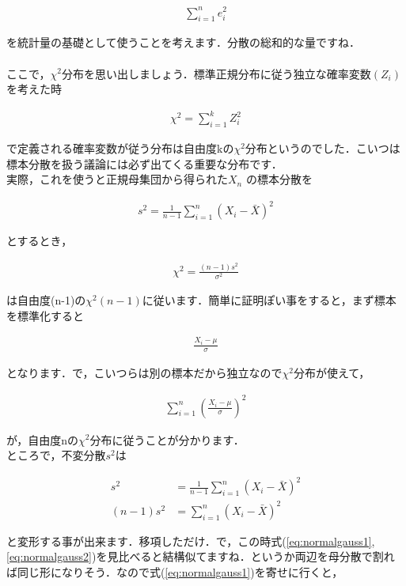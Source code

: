 \documentclass[11pt,a4paper,uplatex]{ujreport} 	%
\begin{document}
\begin{align}
  \sum_{i=1}^n e_i^2
\end{align}

を統計量の基礎として使うことを考えます．分散の総和的な量ですね．\\
\\


ここで，$\chi^2$分布を思い出しましょう．標準正規分布に従う独立な確率変数$(Z_i)$を考えた時

\begin{align}
  \chi^2 = \sum_{i=1}^k Z_i^2
\end{align}

で定義される確率変数が従う分布は自由度kの$\chi^2$分布というのでした．こいつは標本分散を扱う議論には必ず出てくる重要な分布です．\\

実際，これを使うと正規母集団から得られた$X_n$
の標本分散を

\begin{align}
  s^2 = \frac{1}{n-1}\sum_{i=1}^n (X_i - \bar{X})^2
\end{align}

とするとき，

\begin{align}
  \chi^2 = \frac{(n-1)s^2}{\sigma^2}
  \label{eq:chi}
\end{align}

は自由度(n-1)の$\chi^2(n-1)$に従います．簡単に証明ぽい事をすると，まず標本を標準化すると

\begin{align}
  \frac{X_i-\mu}{\sigma}
\end{align}

となります．で，こいつらは別の標本だから独立なので$\chi^2$分布が使えて，

\begin{align}
  \sum_{i=1}^n(\frac{X_i-\mu}{\sigma})^2
  \label{eq:normalgauss2}
\end{align}

が，自由度nの$\chi^2$分布に従うことが分かります．\\

ところで，不変分散$s^2$は

\begin{align}
  s^2 &= \frac{1}{n-1}\sum_{i=1}^n (X_i - \bar{X})^2\\
       (n-1)s^2 &= \sum_{i=1}^n (X_i - \bar{X})^2
      \label{eq:normalgauss1}
\end{align}

と変形する事が出来ます．移項しただけ．で，この時式(\ref{eq:normalgauss1}, \ref{eq:normalgauss2})を見比べると結構似てますね．というか両辺を母分散で割れば同じ形になりそう．なので式(\ref{eq:normalgauss1})を寄せに行くと，
\end{document}
